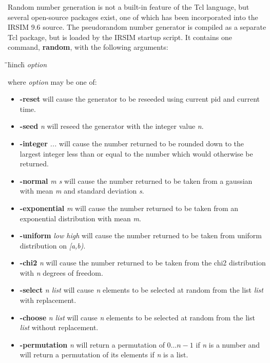 \documentclass[letterpaper,twoside,12pt]{article}
\def\hinch{\hspace*{0.5in}}
\def\starti{\begin{center}\begin{tabbing}\hinch\=\hinch\=\hinch\=hinch\hinch\=\kill}
\def\endi{\end{tabbing}\end{center}}
\def\ii{\>\>\>}
\def\bstf{\bfseries\ttfamily}
\begin{document}
Random number generation is not a built-in feature of the Tcl language,
but several open-source packages exist, one of which has been 
incorporated into the IRSIM 9.6 source.  The pseudorandom number
generator is compiled as a separate Tcl package, but is loaded by
the IRSIM startup script.  It contains one command, {\bstf random},
with the following arguments:
\starti
   \ii {\bstf random} {\itshape option}
\endi
where {\itshape option} may be one of:
\begin{itemize}
  \item [] {\bstf -reset} will cause the generator to be reseeded using
   current pid and current time.

  \item [] {\bstf -seed} {\itshape n} will reseed the generator with the
   integer value {\itshape n}.

  \item [] {\bstf -integer} {\itshape ...} will cause the number returned
   to be rounded down to the largest integer less than or equal to the
   number which would otherwise be returned.

  \item [] {\bstf -normal} {\itshape m s} will cause the number returned
   to be taken from a gaussian with mean {\itshape m} and standard
   deviation {\itshape s}.

  \item [] {\bstf -exponential} {\itshape m} will cause the number
   returned to be taken from an exponential distribution with mean
   {\itshape m}.

  \item [] {\bstf -uniform} {\itshape low high} will cause the number
   returned to be taken from uniform distribution on {\itshape [a,b)}.

  \item [] {\bstf -chi2} {\itshape n} will cause the number returned to be
   taken from the chi2 distribution with {\itshape n} degrees of freedom.

  \item [] {\bstf -select} {\itshape n list} will cause {\itshape n} elements
   to be selected at random from the list {\itshape list} with replacement.

  \item [] {\bstf -choose} {\itshape n list} will cause {\itshape n} elements
   to be selected at random from the list {\itshape list} without replacement.

  \item [] {\bstf -permutation} {\itshape n} will return a permutation
   of $0\dots n-1$ if {\itshape n} is a number and will return a permutation
   of its elements if {\itshape n} is a list.
\end{itemize}
\end{document}
